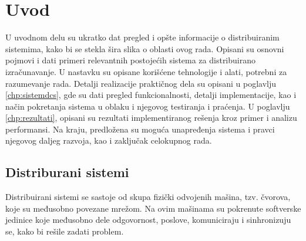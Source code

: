 \documentclass[12pt,oneside]{memoir}
\begin{document}
\frontmatter
\naslovna
\komisija
\apstrakt
\tableofcontents*

\mainmatter

\chapter{Uvod}

U uvodnom delu su ukratko dat pregled i opšte informacije o distribuiranim sistemima, kako bi se stekla šira slika o oblasti ovog rada. Opisani su osnovni pojmovi i dati primeri relevantnih postojećih sistema za distribuirano izračunavanje. U nastavku su opisane korišćene tehnologije i alati, potrebni za razumevanje rada. Detalji realizacije praktičnog dela su opisani u poglavlju \ref{chp:sistemdcs}, gde su dati pregled funkcionalnosti, detalji implementacije, kao i način pokretanja sistema u oblaku i njegovog testiranja i praćenja. U poglavlju \ref{chp:rezultati}, opisani su rezultati implementiranog rešenja kroz primer i analizu performansi. Na kraju, predložena su moguća unapređenja sistema i pravci njegovog daljeg razvoja, kao i zaključak celokupnog rada.

\section{Distriburani sistemi}

Distribuirani sistemi se sastoje od skupa fizički odvojenih mašina, tzv. čvorova, koje su međusobno povezane mrežom. Na ovim mašinama su pokrenute softverske jedinice koje međusobno dele odgovornost, poslove, komuniciraju i sinhronizuju se, kako bi rešile zadati problem.
\end{document}

